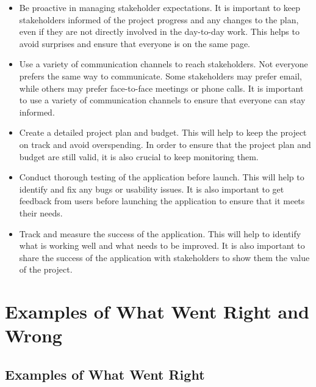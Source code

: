 \begin{itemize}
    \item Be proactive in managing stakeholder expectations. It is important to keep stakeholders informed of the project progress and any changes to the plan, even if they are not directly involved in the day-to-day work. This helps to avoid surprises and ensure that everyone is on the same page.
    \item Use a variety of communication channels to reach stakeholders. Not everyone prefers the same way to communicate. Some stakeholders may prefer email, while others may prefer face-to-face meetings or phone calls. It is important to use a variety of communication channels to ensure that everyone can stay informed.
    \item Create a detailed project plan and budget. This will help to keep the project on track and avoid overspending. In order to ensure that the project plan and budget are still valid, it is also crucial to keep monitoring them.
    \item Conduct thorough testing of the application before launch. This will help to identify and fix any bugs or usability issues. It is also important to get feedback from users before launching the application to ensure that it meets their needs.
    \item Track and measure the success of the application. This will help to identify what is working well and what needs to be improved. It is also important to share the success of the application with stakeholders to show them the value of the project.
\end{itemize}

\section{Examples of What Went Right and Wrong}

\subsection{Examples of What Went Right}

